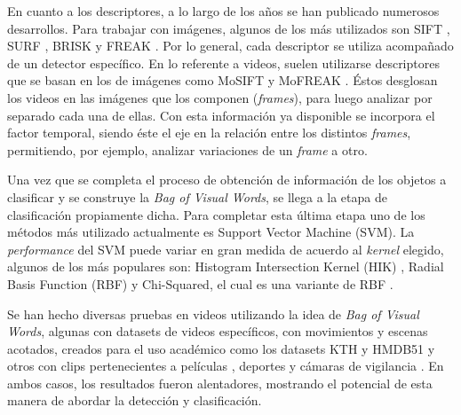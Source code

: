 En cuanto a los descriptores, a lo largo de los años se han publicado numerosos desarrollos. Para trabajar con imágenes, algunos de los más utilizados
son SIFT \parencite{lowe2004distinctive}, SURF \parencite{bay2006surf}, BRISK \parencite{leutenegger2011brisk} y FREAK \parencite{alahi2012freak}.
Por lo general, cada descriptor se utiliza acompañado de un detector específico.
En lo referente a videos, suelen utilizarse descriptores que se basan en los de imágenes como MoSIFT \parencite{chen2009mosift} y
MoFREAK \parencite{whiten2013mofreak}. Éstos desglosan los videos en las imágenes que los componen (\textit{frames}), para luego analizar por separado
cada una de ellas. Con esta información ya disponible se incorpora el factor temporal, siendo éste el eje en la relación entre los distintos \textit{frames},
permitiendo, por ejemplo, analizar variaciones de un \textit{frame} a otro.


Una vez que se completa el proceso de obtención de información de los objetos a clasificar y se construye la \textit{Bag of Visual
Words}, se llega a la etapa de clasificación propiamente dicha. Para completar esta última etapa uno de los métodos más utilizado
actualmente es Support Vector Machine (SVM). La \textit{performance} del SVM puede variar en gran medida de acuerdo al \textit{kernel}
elegido, algunos de los más populares son: Histogram Intersection Kernel (HIK) \parencite{barla2003histogram}, Radial Basis Function (RBF) y Chi-Squared,
el cual es una variante de RBF \parencite{whiten2013mofreak, nievas2011violence}.

Se han hecho diversas pruebas en videos utilizando la idea de \textit{Bag of Visual Words}, algunas con
datasets de videos específicos, con movimientos y escenas acotados, creados para el uso académico como los datasets KTH \parencite{schuldt2004recognizing}
y HMDB51 \parencite{kuehne2011hmdb} \parencite{chen2009mosift, whiten2013mofreak} y otros con clips pertenecientes a películas \parencite{chen2011violence}, deportes
 \parencite{nievas2011violence, deniz2014fast} y cámaras de vigilancia \parencite{chen2009mosift}. En ambos casos, los resultados fueron alentadores, mostrando el
potencial de esta manera de abordar la detección y clasificación.